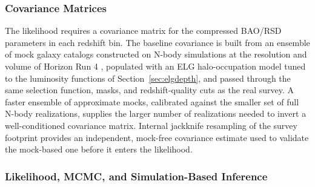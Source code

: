 \documentclass[10pt,onecolumn]{article}
\begin{document}
\subsubsection{Covariance Matrices}\label{sec:covariance}

The likelihood requires a covariance matrix for the compressed BAO/RSD parameters in each redshift bin. The baseline covariance is built from an ensemble of mock galaxy catalogs constructed on N-body simulations at the resolution and volume of Horizon Run 4 \cite{hr4}, populated with an ELG halo-occupation model tuned to the luminosity functions of Section~\ref{sec:elgdepth}, and passed through the same selection function, masks, and redshift-quality cuts as the real survey. A faster ensemble of approximate mocks, calibrated against the smaller set of full N-body realizations, supplies the larger number of realizations needed to invert a well-conditioned covariance matrix. Internal jackknife resampling of the survey footprint provides an independent, mock-free covariance estimate used to validate the mock-based one before it enters the likelihood.

\subsubsection{Likelihood, MCMC, and Simulation-Based Inference}
\end{document}
